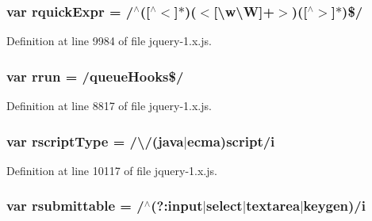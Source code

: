 \subsubsection[{\texorpdfstring{rquick\+Expr}{rquickExpr}}]{\setlength{\rightskip}{0pt plus 5cm}var rquick\+Expr = /$^\wedge$(\mbox{[}$^\wedge$$<$\mbox{]}$\ast$)($<$\mbox{[}\textbackslash{}w\textbackslash{}W\mbox{]}+$>$)(\mbox{[}$^\wedge$$>$\mbox{]}$\ast$)\$/}\hypertarget{jquery-1_8x_8js_adb9a8b088e9580cb8ce6d9d4d08305ae}{}\label{jquery-1_8x_8js_adb9a8b088e9580cb8ce6d9d4d08305ae}


Definition at line 9984 of file jquery-\/1.\+x.\+js.

\subsubsection[{\texorpdfstring{rrun}{rrun}}]{\setlength{\rightskip}{0pt plus 5cm}var rrun = /queue\+Hooks\$/}\hypertarget{jquery-1_8x_8js_acf9d5e6b315eca81eb432bb6ee280a2e}{}\label{jquery-1_8x_8js_acf9d5e6b315eca81eb432bb6ee280a2e}


Definition at line 8817 of file jquery-\/1.\+x.\+js.

\subsubsection[{\texorpdfstring{rscript\+Type}{rscriptType}}]{\setlength{\rightskip}{0pt plus 5cm}var rscript\+Type = /\textbackslash{}/(java$\vert$ecma)script/{\bf i}}\hypertarget{jquery-1_8x_8js_afe9e6e5fe3b5bee3de77fe4004b99f8c}{}\label{jquery-1_8x_8js_afe9e6e5fe3b5bee3de77fe4004b99f8c}


Definition at line 10117 of file jquery-\/1.\+x.\+js.

\subsubsection[{\texorpdfstring{rsubmittable}{rsubmittable}}]{\setlength{\rightskip}{0pt plus 5cm}var rsubmittable = /$^\wedge$(?\+:input$\vert$select$\vert$textarea$\vert$keygen)/{\bf i}}\hypertarget{jquery-1_8x_8js_a12d248d7e6c5985c5ea21f56fbef9e90}{}\label{jquery-1_8x_8js_a12d248d7e6c5985c5ea21f56fbef9e90}



